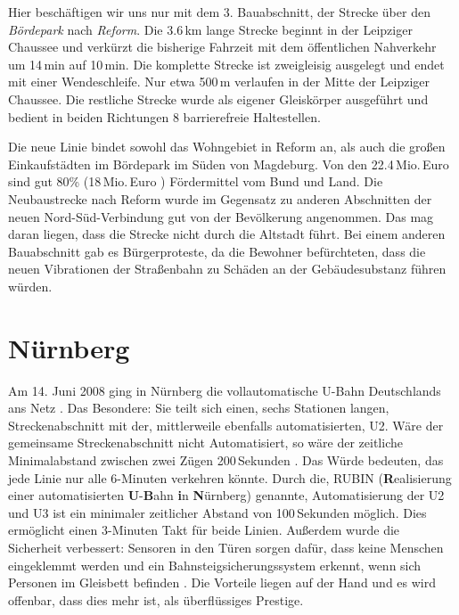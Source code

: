 Hier beschäftigen wir uns nur mit dem 3. Bauabschnitt, der Strecke
über den \textit{Bördepark} nach \textit{Reform}. Die 3.6\,km lange
Strecke beginnt in der Leipziger Chaussee und verkürzt die bisherige
Fahrzeit mit dem öffentlichen Nahverkehr um 14\,min auf 10\,min. Die
komplette Strecke ist zweigleisig ausgelegt und endet mit einer
Wendeschleife. Nur etwa 500\,m verlaufen in der Mitte der Leipziger
Chaussee. Die restliche Strecke wurde als eigener Gleiskörper
ausgeführt und bedient in beiden Richtungen 8 barrierefreie
Haltestellen. \cite{ba3reform}

Die neue Linie bindet sowohl das Wohngebiet in Reform an, als auch die
großen Einkaufstädten im Bördepark im Süden von Magdeburg. Von den
22.4\,Mio.\,Euro \cite{volksstimme2009} sind gut 80\% (18\,Mio.\,Euro
\cite{ba3reform}) Fördermittel vom Bund und Land. Die Neubaustrecke
nach Reform wurde im Gegensatz zu anderen Abschnitten der neuen
Nord-Süd-Verbindung gut von der Bevölkerung angenommen. Das mag
daran liegen, dass die Strecke nicht durch die Altstadt führt. Bei
einem anderen Bauabschnitt gab es Bürgerproteste, da die Bewohner
befürchteten, dass die neuen Vibrationen der Straßenbahn zu Schäden an
der Gebäudesubstanz führen würden. \cite{volksstimme2008}

\section{Nürnberg}

Am 14. Juni 2008 ging in Nürnberg die vollautomatische U-Bahn Deutschlands ans Netz \cite{nbBr}. Das Besondere: Sie teilt sich einen, sechs Stationen langen, Streckenabschnitt mit der, mittlerweile ebenfalls automatisierten, U2. Wäre der gemeinsame Streckenabschnitt nicht Automatisiert, so wäre der zeitliche Minimalabstand zwischen zwei Zügen 200\,Sekunden \cite{nbBr}. Das Würde bedeuten, das jede Linie nur alle 6-Minuten verkehren könnte. Durch die, RUBIN ({\bf R}ealisierung einer automatisierten {\bf U}-{\bf B}ahn {\bf i}n {\bf N}ürnberg) genannte, Automatisierung der U2 und U3 ist ein minimaler zeitlicher Abstand von 100\,Sekunden möglich. Dies ermöglicht einen 3-Minuten Takt für beide Linien. Außerdem wurde die Sicherheit verbessert: Sensoren in den Türen sorgen dafür, dass keine Menschen eingeklemmt werden und ein Bahnsteigsicherungssystem erkennt, wenn sich Personen im Gleisbett befinden \cite{nbBr}. Die Vorteile liegen auf der Hand und es wird offenbar, dass dies mehr ist, als überflüssiges Prestige. 

